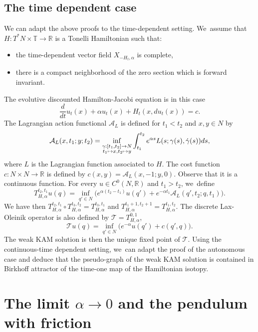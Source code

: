 \documentclass[10pt]{amsart}
\newcommand\mto{\mathchoice{\longmapsto}{\mapsto}{\mapsto}{\mapsto}}
\theoremstyle{definition}
\newcommand{\R}{\mathbb{R}}
\begin{document}
\subsection{The time dependent case}\label{sec:time-dependent}
We can adapt the above proofs to the time-dependent setting. We~assume that $H:T^*N\times {\mathbb T}\to \R$ is a Tonelli Hamiltonian such that:
\begin{itemize}
\item the time-dependent vector field $X_{-H_t, \alpha}$ is complete,
\item there is a compact neighborhood of the zero section which is forward invariant.
\end{itemize}
The evolutive discounted Hamilton-Jacobi equation is in this case
\begin{equation}
\label{eq:HJTD-discounted}
\frac d{dt}u_t(x)+\alpha u_t(x) + H_t(x,du_t(x))=c.
\end{equation}
The Lagrangian action functional $\mathcal A_L$ is defined for $t_1<t_2$ and $x, y\in N$ by
\[
\mathcal A_L(x, t_1; y; t_2)=\inf_{\substack{\gamma:[t_1, t_2]\to N\\t_1\mto x, t_2\mto y}} \int_{t_1}^{t_2}e^{\alpha s}L(s;\gamma(s), \dot \gamma (s))ds,
\]
where $L$ is the Lagrangian function associated to $H$.
The cost function $c:N\times N\to \R$ is defined by $c(x,y)=\mathcal A_L(x, -1; y, 0)$. Observe that it is a continuous function.
For every $u\in C^0(N, \R)$ and $t_1>t_2$, we~define
\[
T_{H, \alpha}^{t_2, t_1}u(q)=\inf_{q'\in N} \bigl(e^{\alpha (t_2-t_1)}u(q')+e^{-\alpha t_1}\mathcal A_L (q', t_2; q, t_1)\bigr).
\]
We have then $T_{H, \alpha}^{t_2, t_1}\circ T_{H, \alpha}^{t_3, t_2}=T_{H, \alpha}^{t_3, t_1}$ and $T_{H, \alpha}^{t_1+1, t_2+1}=T_{H, \alpha}^{t_1, t_2}$. The discrete Lax-Oleinik operator is also defined by $\mathcal T=T_{H, \alpha}^{0, 1}$, \ie
\[
\mathcal T u(q)= \inf_{q'\in N} \bigl(e^{-\alpha}u(q')+c(q', q)\bigr).
\]
The weak KAM solution is then the unique fixed point of $\mathcal T$. Using the continuous-time dependent setting, we~can adapt the proof of the autonomous case and deduce that
the pseudo-graph of the weak KAM solution is contained in
Birkhoff attractor of the time-one map of the Hamiltonian isotopy.

\section{The limit \texorpdfstring{$\alpha \to 0$}{a to 0} and the pendulum with friction}\label{sec:alpha-to-1}
\end{document}
